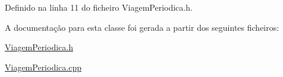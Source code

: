 Definido na linha 11 do ficheiro Viagem\+Periodica.\+h.



A documentação para esta classe foi gerada a partir dos seguintes ficheiros\+:\begin{DoxyCompactItemize}
\item 
\hyperlink{_viagem_periodica_8h}{Viagem\+Periodica.\+h}\item 
\hyperlink{_viagem_periodica_8cpp}{Viagem\+Periodica.\+cpp}\end{DoxyCompactItemize}
